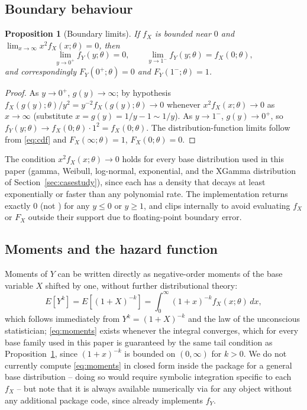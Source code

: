 \documentclass[article]{jss}
\newtheorem{proposition}{Proposition}
\begin{document}
\subsection{Boundary behaviour}

\begin{proposition}[Boundary limits]
\label{prop:boundary}
If $f_X$ is bounded near $0$ and $\lim_{x\to\infty} x^2 f_X(x;\theta) = 0$, then
\begin{equation}
  \lim_{y\to 0^+} f_Y(y;\theta) = 0, \qquad
  \lim_{y\to 1^-} f_Y(y;\theta) = f_X(0;\theta),
\end{equation}
and correspondingly $F_Y(0^+;\theta)=0$ and $F_Y(1^-;\theta)=1$.
\end{proposition}
\begin{proof}
As $y\to0^+$, $g(y)\to\infty$; by hypothesis $f_X(g(y);\theta)/y^2 = y^{-2}f_X(g(y);\theta) \to 0$ whenever $x^2f_X(x;\theta)\to0$ as $x\to\infty$ (substitute $x=g(y)=1/y-1\sim 1/y$). As $y\to1^-$, $g(y)\to0^+$, so $f_Y(y;\theta)\to f_X(0;\theta)\cdot 1^2 = f_X(0;\theta)$. The distribution-function limits follow from \eqref{eq:cdf} and $F_X(\infty;\theta)=1$, $F_X(0;\theta)=0$.
\end{proof}

The condition $x^2f_X(x;\theta)\to0$ holds for every base distribution used in this paper (gamma, Weibull, log-normal, exponential, and the XGamma distribution of Section~\ref{sec:casestudy}), since each has a density that decays at least exponentially or faster than any polynomial rate. The implementation returns exactly $0$ (not ) for any $y \le 0$ or $y \ge 1$, and clips internally to avoid evaluating $f_X$ or $F_X$ outside their support due to floating-point boundary error.

\subsection{Moments and the hazard function}

Moments of $Y$ can be written directly as negative-order moments of the base variable $X$ shifted by one, without further distributional theory:
\begin{equation}
  E[Y^k] = E\!\left[(1+X)^{-k}\right] = \int_0^\infty (1+x)^{-k} f_X(x;\theta)\,dx,
  \label{eq:moments}
\end{equation}
which follows immediately from $Y^k = (1+X)^{-k}$ and the law of the unconscious statistician; \eqref{eq:moments} exists whenever the integral converges, which for every base family used in this paper is guaranteed by the same tail condition as Proposition~\ref{prop:boundary}, since $(1+x)^{-k}$ is bounded on $(0,\infty)$ for $k>0$. We do not currently compute \eqref{eq:moments} in closed form inside the package for a general base distribution -- doing so would require symbolic integration specific to each $f_X$ -- but note that it is always available numerically via  for any  object without any additional package code, since  already implements $f_Y$.
\end{document}
